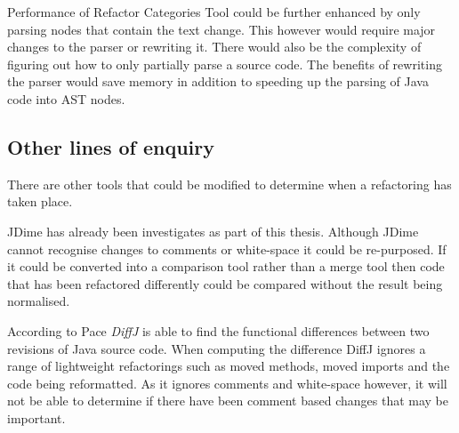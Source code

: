 Performance of Refactor Categories Tool could be further enhanced by only parsing nodes that contain the text change.
This however would require major changes to the parser or rewriting it. There would also be the complexity of figuring out how to only partially parse a source code.
The benefits of rewriting the parser would save memory in addition to speeding up the parsing of Java code into AST nodes.


\subsection{Other lines of enquiry}

There are other tools that could be modified to determine when a refactoring has taken place.

JDime has already been investigates as part of this thesis.
Although JDime cannot recognise changes to comments or white-space it could be re-purposed.
If it could be converted into a comparison tool rather than a merge tool then code that has been refactored differently could be compared without the result being normalised.

According to Pace \cite{Pace} \emph{DiffJ} is able to find the functional differences between two revisions of Java source code.
When computing the difference DiffJ ignores a range of lightweight refactorings such as moved methods, moved imports and the code being reformatted. 
As it ignores comments and white-space however, it will not be able to determine if there have been comment based changes that may be important. 



% 
% 
